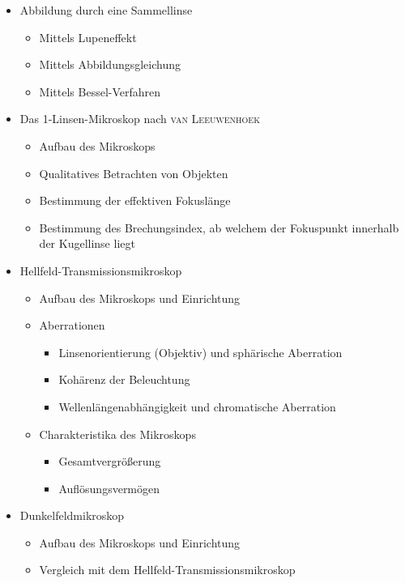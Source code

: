 \documentclass[ngerman]{scrartcl}
\begin{document}
\begin{itemize}
    \item Abbildung durch eine Sammellinse
          \begin{itemize}
              \item Mittels Lupeneffekt
              \item Mittels Abbildungsgleichung
              \item Mittels Bessel-Verfahren
          \end{itemize}
    \item Das 1-Linsen-Mikroskop nach \textsc{van Leeuwenhoek}
          \begin{itemize}
              \item Aufbau des Mikroskops
              \item Qualitatives Betrachten von Objekten
              \item Bestimmung der effektiven Fokuslänge
              \item Bestimmung des Brechungsindex, ab welchem der Fokuspunkt innerhalb der Kugellinse liegt
          \end{itemize}
    \item Hellfeld-Transmissionsmikroskop
          \begin{itemize}
              \item Aufbau des Mikroskops und Einrichtung
              \item Aberrationen
                    \begin{itemize}
                        \item Linsenorientierung (Objektiv) und sphärische Aberration
                        \item Kohärenz der Beleuchtung
                        \item Wellenlängenabhängigkeit und chromatische Aberration
                    \end{itemize}
              \item Charakteristika des Mikroskops
                    \begin{itemize}
                        \item Gesamtvergrößerung
                        \item Auflösungsvermögen
                    \end{itemize}
          \end{itemize}
    \item Dunkelfeldmikroskop
          \begin{itemize}
              \item Aufbau des Mikroskops und Einrichtung
              \item Vergleich mit dem Hellfeld-Transmissionsmikroskop
          \end{itemize}
\end{itemize}
\end{document}
